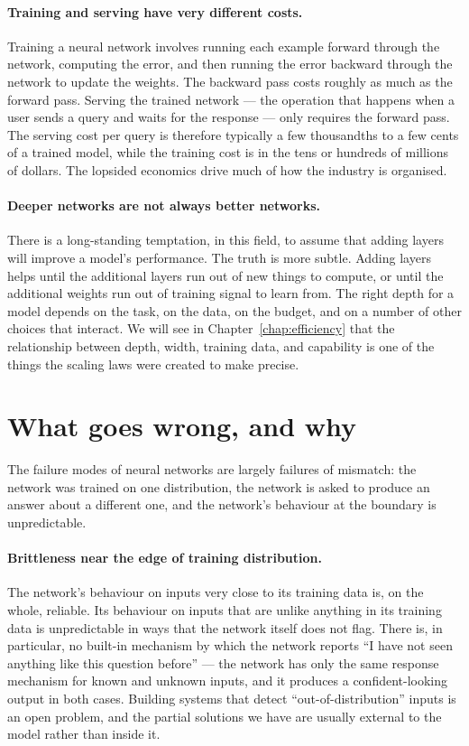 \paragraph{Training and serving have very different costs.}
Training a neural network involves running each example forward
through the network, computing the error, and then running the
error backward through the network to update the weights. The
backward pass costs roughly as much as the forward pass.
Serving the trained network --- the operation that happens
when a user sends a query and waits for the response --- only
requires the forward pass. The serving cost per query is
therefore typically a few thousandths to a few cents of a
trained model, while the training cost is in the tens or
hundreds of millions of dollars. The lopsided economics drive
much of how the industry is organised.

\paragraph{Deeper networks are not always better networks.}
There is a long-standing temptation, in this field, to assume
that adding layers will improve a model's performance. The
truth is more subtle. Adding layers helps until the additional
layers run out of new things to compute, or until the
additional weights run out of training signal to learn from.
The right depth for a model depends on the task, on the data,
on the budget, and on a number of other choices that
interact. We will see in Chapter~\ref{chap:efficiency} that the relationship
between depth, width, training data, and capability is one of
the things the scaling laws were created to make precise.

\section{What goes wrong, and why}

The failure modes of neural networks are largely failures of
mismatch: the network was trained on one distribution, the
network is asked to produce an answer about a different one, and
the network's behaviour at the boundary is unpredictable.

\paragraph{Brittleness near the edge of training distribution.}
The network's behaviour on inputs very close to its training
data is, on the whole, reliable. Its behaviour on inputs that
are unlike anything in its training data is unpredictable in
ways that the network itself does not flag. There is, in
particular, no built-in mechanism by which the network reports
``I have not seen anything like this question before'' --- the
network has only the same response mechanism for known and
unknown inputs, and it produces a confident-looking output in
both cases. Building systems that detect ``out-of-distribution''
inputs is an open problem, and the partial solutions we have
are usually external to the model rather than inside it.

